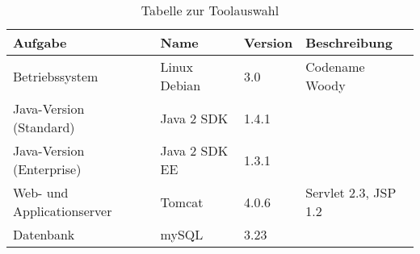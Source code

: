 \begin{table}[h]
\centering
\caption{Tabelle zur Toolauswahl}
\begin{tabular}{|l|l|l|l|}

  \hline
  \textbf{Aufgabe} & \textbf{Name} & \textbf{Version} & \textbf{Beschreibung} \\ \hline\hline
  Betriebssystem    & Linux Debian            & 3.0          & Codename Woody        \\ \hline
  Java-Version (Standard) & Java 2 SDK       & 1.4.1        &                       \\ \hline
  Java-Version (Enterprise) & Java 2 SDK  EE & 1.3.1        &                       \\ \hline
  Web- und Applicationserver & Tomcat        & 4.0.6        & Servlet 2.3, JSP 1.2  \\ \hline
  Datenbank        & mySQL                   & 3.23         &                       \\ \hline
\end{tabular}
\end{table}
